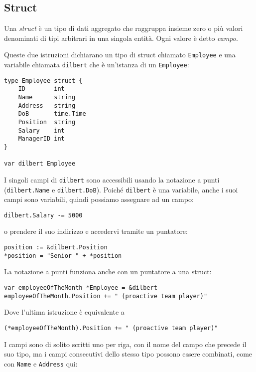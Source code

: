 \documentclass[../../thesis.tex]{subfiles}
\begin{document}
    \subsection{Struct}\label{subsec:struct}
    Una \textit{struct} è un tipo di dati aggregato che raggruppa insieme zero o più valori denominati di tipi arbitrari in una singola entità.
    Ogni valore è detto \textit{campo}.
    \hfill \vspace{12pt}

    Queste due istruzioni dichiarano un tipo di struct chiamato \verb"Employee" e una variabile chiamata \verb"dilbert" che è un'istanza di un \verb"Employee":
    \begin{lstlisting}[frame = single, label = {lst:lstlisting3-4.1}]
type Employee struct {
    ID 	      int
    Name      string
    Address   string
    DoB       time.Time
    Position  string
    Salary    int
    ManagerID int
}

var dilbert Employee
    \end{lstlisting}
    I singoli campi di \verb"dilbert" sono accessibili usando la notazione a punti (\verb"dilbert.Name" e \verb"dilbert.DoB").
    Poiché \verb"dilbert" è una variabile, anche i suoi campi sono variabili, quindi possiamo assegnare ad un campo:
    \begin{lstlisting}[frame = single, label = {lst:lstlisting3-4.2}]
dilbert.Salary -= 5000
    \end{lstlisting}
    o prendere il suo indirizzo e accedervi tramite un puntatore:
    \begin{lstlisting}[frame = single, label = {lst:lstlisting3-4.3}]
position := &dilbert.Position
*position = "Senior " + *position
    \end{lstlisting}
    La notazione a punti funziona anche con un puntatore a una struct:
    \begin{lstlisting}[frame = single, label = {lst:lstlisting3-4.4}]
var employeeOfTheMonth *Employee = &dilbert
employeeOfTheMonth.Position += " (proactive team player)"
    \end{lstlisting}
    Dove l'ultima istruzione è equivalente a
    \begin{lstlisting}[frame = single, label = {lst:lstlisting3-4.5}]
(*employeeOfTheMonth).Position += " (proactive team player)"
    \end{lstlisting}
    I campi sono di solito scritti uno per riga, con il nome del campo che precede il suo tipo, ma i campi consecutivi dello stesso tipo possono essere combinati, come con \verb"Name" e \verb"Address" qui:
\end{document}
